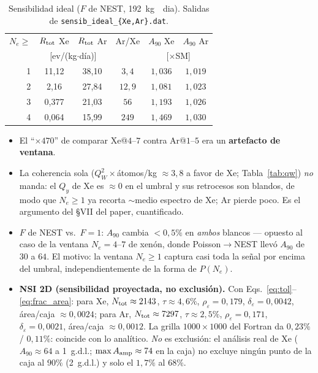 \documentclass[11pt,a4paper]{article}
\newcommand{\eps}{\varepsilon}
\newcommand{\QW}{Q_{W}}
\newcommand{\Ne}{N_{e}}
\newcommand{\Aamp}{A_{\rm amp}}
\newcommand{\code}[1]{\texttt{#1}}
\begin{document}
\begin{table}[h]
\centering
\begin{tabular}{@{}rccccc@{}}
\toprule
$\Ne\ge$ & $R_{\rm tot}$ Xe & $R_{\rm tot}$ Ar & Ar/Xe & $A_{90}$ Xe & $A_{90}$ Ar \\
         & \multicolumn{2}{c}{[ev/(kg$\cdot$d\'ia)]} & & \multicolumn{2}{c}{[$\times$SM]} \\
\midrule
1 & 11{,}12 & 38{,}10 & $3{,}4$ & $1{,}036$ & $1{,}019$ \\
2 &  2{,}16 & 27{,}84 & $12{,}9$ & $1{,}081$ & $1{,}023$ \\
3 &  0{,}377 & 21{,}03 & $56$ & $1{,}193$ & $1{,}026$ \\
4 &  0{,}064 & 15{,}99 & $249$ & $1{,}469$ & $1{,}030$ \\
\bottomrule
\end{tabular}
\caption{Sensibilidad ideal ($F$ de NEST, \SI{192}{kg\cdot dia}). Salidas de
\code{sensib\_ideal\_\{Xe,Ar\}.dat}.}
\label{tab:ideal}
\end{table}

\begin{itemize}\itemsep2pt
  \item El ``$\times 470$'' de comparar Xe@$4$--$7$ contra Ar@$1$--$5$ era un
    \textbf{artefacto de ventana}.
  \item La coherencia sola ($\QW^{2}\times$\'atomos/kg $\approx 3{,}8$ a favor de
    Xe; Tabla~\ref{tab:qw}) \emph{no} manda: el $Q_{y}$ de Xe es $\approx 0$ en el
    umbral y sus retrocesos son blandos, de modo que $\Ne\ge 1$ ya recorta
    $\sim$medio espectro de Xe; Ar pierde poco. Es el argumento del \S VII del
    paper, cuantificado.
  \item $F$ de NEST vs.\ $F=1$: $A_{90}$ cambia $<0{,}5\%$ en \emph{ambos}
    blancos --- opuesto al caso de la ventana $\Ne=4$--$7$ de xen\'on, donde
    Poisson$\to$NEST llev\'o $A_{90}$ de $30$ a $64$. El motivo: la ventana
    $\Ne\ge 1$ captura casi toda la se\~nal por encima del umbral,
    independientemente de la forma de $P(\Ne)$.
  \item \textbf{NSI 2D (sensibilidad proyectada, no exclusi\'on).} Con
    Eqs.~\eqref{eq:tol}--\eqref{eq:frac_area}: para Xe,
    $N_{\rm tot}\approx 2143$, $\tau\approx 4{,}6\%$, $\rho_{\eps}=0{,}179$,
    $\delta_{\eps}=0{,}0042$, \'area/caja $\approx 0{,}0024$; para Ar,
    $N_{\rm tot}\approx 7297$, $\tau\approx 2{,}5\%$, $\rho_{\eps}=0{,}171$,
    $\delta_{\eps}=0{,}0021$, \'area/caja $\approx 0{,}0012$. La grilla
    $1000\times 1000$ del Fortran da $0{,}23\%$ / $0{,}11\%$: coincide con lo
    anal\'itico. \emph{No} es exclusi\'on: el an\'alisis real de Xe
    ($A_{90}\approx 64$ a 1~g.d.l.; $\max\Aamp\approx 74$ en la caja) no excluye
    ning\'un punto de la caja al $90\%$ (2~g.d.l.) y solo el $1{,}7\%$ al $68\%$.
\end{itemize}
\end{document}
